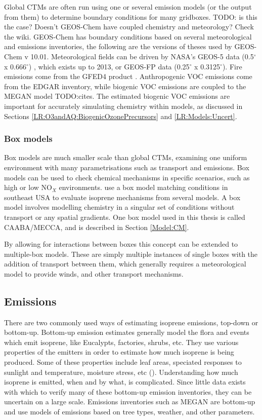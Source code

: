   Global CTMs are often run using one or several emission models (or the output from them) to determine boundary conditions for many gridboxes.
  TODO: is this the case? Doesn't GEOS-Chem have coupled chemistry and meteorology? Check the wiki.
  GEOS-Chem has boundary conditions based on several meteorological and emissions inventories, the following are the versions of theses used by GEOS-Chem v 10.01. 
  Meteorological fields can be driven by NASA's GEOS-5 data (0.5$^{\circ}$ x 0.666$^{\circ}$) \citep{Chen2009}, which exists up to 2013, or GEOS-FP data (0.25$^{\circ}$ x 0.3125$^{\circ}$).
  Fire emissions come from the GFED4 product \citep{Giglio2013}. 
  Anthropogenic VOC emissions come from the EDGAR inventory, while biogenic VOC emissions are coupled to the MEGAN model TODO:cites.
  The estimated biogenic VOC emissions are important for accurately simulating chemistry within models, as discussed in Sections \ref{LR:O3andAQ:BiogenicOzonePrecursors} and \ref{LR:Models:Uncert}.
  
  \subsubsection{Box models}
    Box models are much smaller scale than global CTMs, examining one uniform environment with many parametrisations such as transport and emissions.
    Box models can be used to check chemical mechanisms in specific scenarios, such as high or low NO$_X$ environments.
    \cite{Marvin2017} use a box model matching conditions in southeast USA to evaluate isoprene mechanisms from several models.  
    A box model involves modelling chemistry in a singular set of conditions without transport or any spatial gradients.
    One box model used in this thesis is called CAABA/MECCA, and is described in Section \ref{Model:CM}.
    
    By allowing for interactions between boxes this concept can be extended to multiple-box models.
    These are simply multiple instances of single boxes with the addition of transport between them, which generally requires a meteorological model to provide winds, and other transport mechanisms.
  
  
  \subsection{Emissions}
  
  There are two commonly used ways of estimating isoprene emissions, top-down or bottom-up.
  Bottom-up emission estimates generally model the flora and events which emit isoprene, like Eucalypts, factories, shrubs, etc.
  They use various properties of the emitters in order to estimate how much isoprene is being produced.
  Some of these properties include leaf areas, speciated responses to sunlight and temperature, moisture stress, etc (\cite{Guenther1995,Guenther2006}).
  Understanding how much isoprene is emitted, when and by what, is complicated.
  Since little data exists with which to verify many of these bottom-up emission inventories, they can be uncertain on a large scale.
  Emissions inventories such as MEGAN are bottom-up and use models of emissions based on tree types, weather, and other parameters.
  
